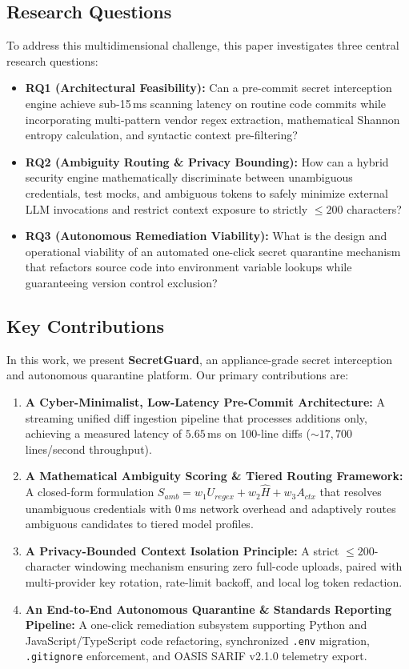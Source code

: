 \subsection{Research Questions}
To address this multidimensional challenge, this paper investigates three central research questions:
\begin{itemize}
    \item \textbf{RQ1 (Architectural Feasibility):} Can a pre-commit secret interception engine achieve sub-15\,ms scanning latency on routine code commits while incorporating multi-pattern vendor regex extraction, mathematical Shannon entropy calculation, and syntactic context pre-filtering?
    \item \textbf{RQ2 (Ambiguity Routing \& Privacy Bounding):} How can a hybrid security engine mathematically discriminate between unambiguous credentials, test mocks, and ambiguous tokens to safely minimize external LLM invocations and restrict context exposure to strictly $\le 200$ characters?
    \item \textbf{RQ3 (Autonomous Remediation Viability):} What is the design and operational viability of an automated one-click secret quarantine mechanism that refactors source code into environment variable lookups while guaranteeing version control exclusion?
\end{itemize}

\subsection{Key Contributions}
In this work, we present \textbf{SecretGuard}, an appliance-grade secret interception and autonomous quarantine platform. Our primary contributions are:
\begin{enumerate}
    \item \textbf{A Cyber-Minimalist, Low-Latency Pre-Commit Architecture:} A streaming unified diff ingestion pipeline that processes additions only, achieving a measured latency of $5.65$\,ms on 100-line diffs ($\sim 17,700$ lines/second throughput).
    \item \textbf{A Mathematical Ambiguity Scoring \& Tiered Routing Framework:} A closed-form formulation $S_{amb} = w_1 U_{regex} + w_2 \hat{H} + w_3 A_{ctx}$ that resolves unambiguous credentials with 0\,ms network overhead and adaptively routes ambiguous candidates to tiered model profiles.
    \item \textbf{A Privacy-Bounded Context Isolation Principle:} A strict $\le 200$-character windowing mechanism ensuring zero full-code uploads, paired with multi-provider key rotation, rate-limit backoff, and local log token redaction.
    \item \textbf{An End-to-End Autonomous Quarantine \& Standards Reporting Pipeline:} A one-click remediation subsystem supporting Python and JavaScript/TypeScript code refactoring, synchronized \texttt{.env} migration, \texttt{.gitignore} enforcement, and OASIS SARIF v2.1.0 telemetry export.
\end{enumerate}
